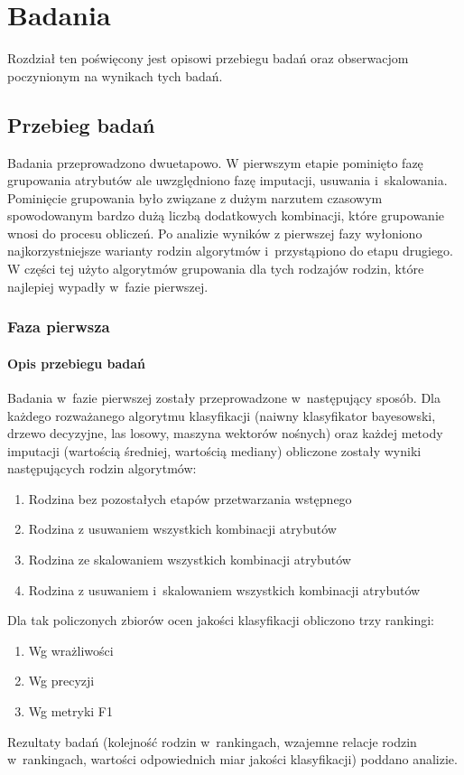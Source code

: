 \documentclass[../thesis.tex]{subfiles}
\begin{document}
\pagestyle{plain}
\chapter{Badania}

Rozdział ten poświęcony jest opisowi przebiegu badań oraz obserwacjom poczynionym na wynikach tych badań. 

\section{Przebieg badań}

Badania przeprowadzono dwuetapowo. W pierwszym etapie pominięto fazę grupowania atrybutów ale uwzględniono fazę imputacji, usuwania i~skalowania. Pominięcie grupowania było związane z dużym narzutem czasowym spowodowanym bardzo dużą liczbą dodatkowych kombinacji, które grupowanie wnosi do procesu obliczeń. Po analizie wyników z pierwszej fazy wyłoniono najkorzystniejsze warianty rodzin algorytmów i~przystąpiono do etapu drugiego. W części tej użyto algorytmów grupowania dla tych rodzajów rodzin, które najlepiej wypadły w~fazie pierwszej.

\subsection{Faza pierwsza}

\subsubsection{Opis przebiegu badań}

Badania w~fazie pierwszej zostały przeprowadzone w~następujący sposób. Dla każdego rozważanego algorytmu klasyfikacji (naiwny klasyfikator bayesowski, drzewo decyzyjne, las losowy, maszyna wektorów nośnych) oraz każdej metody imputacji (wartością średniej, wartością mediany) obliczone zostały wyniki następujących rodzin algorytmów:

\begin{enumerate}
  \item Rodzina bez pozostałych etapów przetwarzania wstępnego
  \item Rodzina z usuwaniem wszystkich kombinacji atrybutów
  \item Rodzina ze skalowaniem wszystkich kombinacji atrybutów
  \item Rodzina z usuwaniem i~skalowaniem wszystkich kombinacji atrybutów
\end{enumerate}
Dla tak policzonych zbiorów ocen jakości klasyfikacji obliczono trzy rankingi:
\begin{enumerate}
  \item Wg wrażliwości
  \item Wg precyzji
  \item Wg metryki F1
\end{enumerate}
Rezultaty badań (kolejność rodzin w~rankingach, wzajemne relacje rodzin w~rankingach, wartości odpowiednich miar jakości klasyfikacji) poddano analizie.
\end{document}
